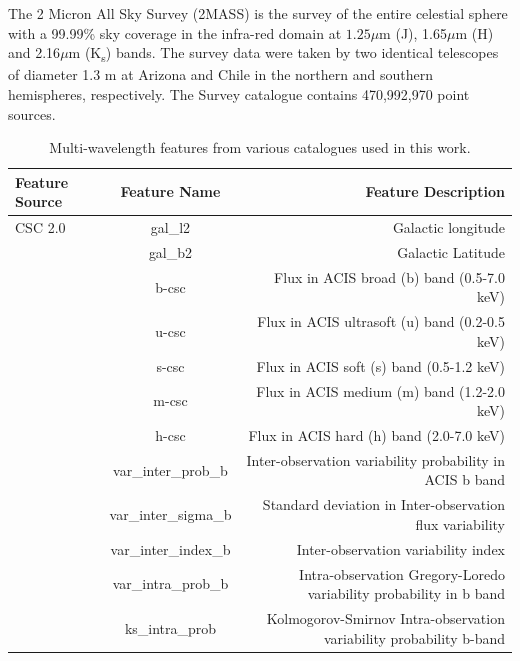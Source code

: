 \documentclass[fleqn,usenatbib]{mnras}
\begin{document}
The 2 Micron All Sky Survey (2MASS) \citep{2006AJ....131.1163S} is the survey of the entire celestial sphere with a 99.99\% sky coverage in the infra-red domain at $1.25\mu$m (J), 1.65$\mu$m (H) and 2.16$\mu$m (K\textsubscript{s}) bands. The survey data were taken by two identical telescopes of diameter 1.3 m at Arizona and Chile in the northern and southern hemispheres, respectively. The Survey catalogue contains 470,992,970 point sources. 


     \begin{table}
    \centering
    \thispagestyle{empty}
    \caption{Multi-wavelength features from various catalogues used in this work.}
    \label{tab:feature-table}
    \begin{tabular}{lcr}
    \hline
    \textbf{Feature Source} & \textbf{Feature Name}        & \textbf{Feature Description}                                      \\ \hline
    CSC 2.0              & gal\_l2              & Galactic longitude                                        \\
                     & gal\_b2              & Galactic Latitude                                         \\
                     & b-csc                & Flux in ACIS broad (b) band (0.5-7.0 keV)                 \\ 
                     & u-csc                & Flux in ACIS ultrasoft (u) band (0.2-0.5 keV)             \\
                     & s-csc                & Flux in ACIS soft (s) band (0.5-1.2 keV)                  \\
                     & m-csc                & Flux in ACIS medium (m) band (1.2-2.0 keV)                \\
                     & h-csc                & Flux in ACIS hard (h) band (2.0-7.0 keV)                  \\
         & var\_inter\_prob\_b  & Inter-observation variability probability in ACIS b band            \\
         & var\_inter\_sigma\_b & Standard deviation in Inter-observation flux variability            \\
                     & var\_inter\_index\_b & Inter-observation variability index                       \\
         & var\_intra\_prob\_b  & Intra-observation Gregory-Loredo variability  probability in b band \\
         & ks\_intra\_prob      & Kolmogorov-Smirnov Intra-observation variability probability b-band \\

\end{tabular}
\end{table}
\end{document}
